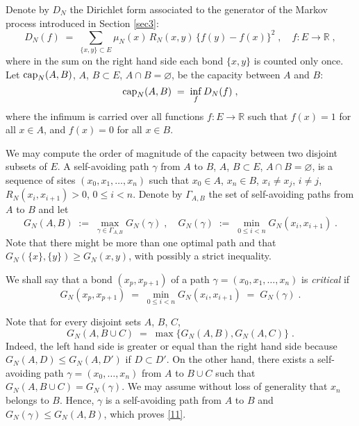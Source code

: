 \documentclass[reqno]{amsart}
\begin{document}
Denote by $D_N$ the Dirichlet form associated to the generator of the
Markov process introduced in Section \ref{sec3}:
\begin{equation*}
D_N(f)\;=\; \sum_{\{x,y\}\subset E} \mu_N(x) \, R_N(x,y) \, 
\{f(y) - f(x)\}^2 \;, \quad f:E\to {{\mathbb R}}\;, 
\end{equation*}
where in the sum on the right hand side each bond $\{x,y\}$ is counted
only once. Let ${{\rm cap}}_N(A,B)$, $A$, $B\subset E$, $A\cap
B=\varnothing$, be the capacity between $A$ and $B$:
\begin{equation}
\label{25}
{{\rm cap}}_N(A,B) \;=\; \inf_f D_N(f)\;,
\end{equation}
where the infimum is carried over all functions $f:E\to {{\mathbb R}}$ such
that $f(x) =1$ for all $x\in A$, and $f(x) =0$ for all $x\in B$.

We may compute the order of magnitude of the capacity between two
disjoint subsets of $E$.  A
self-avoiding path $\gamma$ from $A$ to $B$, $A$, $B\subset E$, $A\cap
B = \varnothing$, is a sequence of sites $(x_0, x_1, \dots, x_n)$ such
that $x_0\in A$, $x_n\in B$, $x_i \not = x_j$, $i\not =j$,
$R_N(x_i,x_{i+1})>0$, $0\le i <n$. Denote by $\Gamma_{A,B}$ the set of
self-avoiding paths from $A$ to $B$ and let
\begin{equation*}
G_N(A,B) \;:=\; \max_{\gamma\in \Gamma_{A,B}} G_N(\gamma)\;, \quad
G_N(\gamma) \;:=\; \min_{0\le i<n} G_N(x_i,x_{i+1})\;.
\end{equation*}
Note that there might be more than one optimal path and that
$G_N(\{x\},\{y\}) \ge G_N(x,y)$, with possibly a strict inequality.

We shall say that a bond $(x_p,x_{p+1})$ of a path $\gamma = (x_0,
x_1, \dots, x_n)$ is \emph{critical} if
\begin{equation*}
G_N(x_p,x_{p+1}) \;=\; \min_{0\le i<n} G_N(x_i,x_{i+1})
\;=\; G_N(\gamma) \;.
\end{equation*}

Note that for every disjoint sets $A$, $B$, $C$,
\begin{equation}
\label{11}
G_N(A,B\cup C) \;=\; \max\{G_N(A,B), G_N(A,C) \}\;.
\end{equation}
Indeed, the left hand side is greater or equal than the right hand
side because $G_N(A,D)\le G_N(A,D')$ if $D\subset D'$. On the other
hand, there exists a self-avoiding path $\gamma =(x_0, \dots, x_n)$
from $A$ to $B\cup C$ such that $G_N(A,B\cup C) = G_N(\gamma)$. We may
assume without loss of generality that $x_n$ belongs to $B$.  Hence,
$\gamma$ is a self-avoiding path from $A$ to $B$ and $G_N(\gamma) \le
G_N(A,B)$, which proves \eqref{11}.
\end{document}
